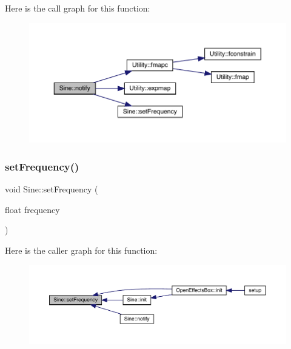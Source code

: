 Here is the call graph for this function\+:\nopagebreak
\begin{figure}[H]
\begin{center}
\leavevmode
\includegraphics[width=350pt]{class_sine_a91e8327318758647ea3e0f856eb3eb60_cgraph}
\end{center}
\end{figure}
\mbox{\label{class_sine_a9a82b09716b1f52440162af589f3fc56}} 
\subsubsection{\texorpdfstring{set\+Frequency()}{setFrequency()}}
{\footnotesize\ttfamily void Sine\+::set\+Frequency (\begin{DoxyParamCaption}\item[{float}]{frequency }\end{DoxyParamCaption})}

Here is the caller graph for this function\+:\nopagebreak
\begin{figure}[H]
\begin{center}
\leavevmode
\includegraphics[width=350pt]{class_sine_a9a82b09716b1f52440162af589f3fc56_icgraph}
\end{center}
\end{figure}
\mbox{\label{class_sine_a84981bef49077a86ec953298d9e3e1d1}} 
